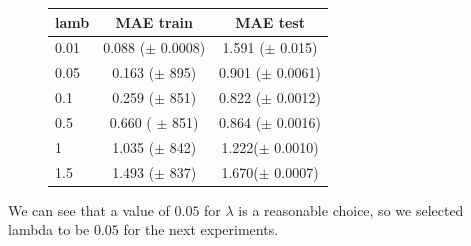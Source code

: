 \begin{figure}[h]
\begin{minipage}{\textwidth}
\begin{minipage}[b]{0.45\textwidth}
  \end{minipage}
  \hfill
  \begin{minipage}[b]{0.5\textwidth}
  \begin{center}
  \begin{tabular}{ |l | c | c| }
    \hline
     lamb & MAE train & MAE test \\ \hline
     0.01   & 0.088 ($\pm$  0.0008) &  1.591 ($\pm$ 0.015) \\ \hline
     0.05  &  0.163 ($\pm$  895) &  0.901 ($\pm$  0.0061) \\ \hline
     0.1     & 0.259 ($\pm$ 851)  & 0.822 ($\pm$ 0.0012) \\ \hline
     0.5    & 0.660  ( $\pm$ 851) & 0.864 ($\pm$  0.0016)\\ \hline
     1       & 1.035 ($\pm$ 842) & 1.222($\pm$  0.0010)\\ \hline
     1.5    & 1.493 ($\pm$ 837) & 1.670($\pm$  0.0007) \\
    \hline
  \end{tabular}
\end{center}
	\vspace{10 mm}
    \end{minipage}
    
\label{fig:ALS_lambdas} 
  \end{minipage}
\end{figure}  
  
We can see that a value of $0.05$ for $\lambda$ is a reasonable choice, so we selected lambda to be $0.05$ for the next experiments. 


